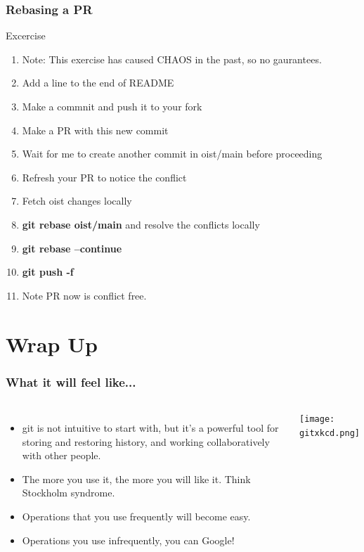 \documentclass{beamer}
\begin{document}
\begin{frame}[fragile]
	\frametitle{Rebasing a PR}
	\begin{block}{Excercise}
		\begin{enumerate}
			\item Note: This exercise has caused CHAOS in the past, so no gaurantees. 
			\item Add a line to the end of README
			\item Make a commnit and push it to your fork
			\item Make a PR with this new commit
			\item Wait for me to create another commit in oist/main before proceeding
			\item Refresh your PR to notice the conflict
			\item Fetch oist changes locally
			\item \textbf{git rebase oist/main} and resolve the conflicts locally
			\item \textbf{git rebase --continue}
			\item \textbf{git push -f}
			\item Note PR now is conflict free. 
		\end{enumerate}
	\end{block}
\end{frame}

\section{Wrap Up}

\begin{frame}
\frametitle{What it will feel like...}
\begin{columns}
\begin{itemize}
\item git is not intuitive to start with, but it's %
a powerful tool for storing and restoring history, and working collaboratively with other people.
\item The more you use it, the more you will like it. Think Stockholm syndrome.
\item Operations that you use frequently will become easy.
\item Operations you use infrequently, you can Google!
\end{itemize}
\texttt{[image: gitxkcd.png]}
\end{columns}
\end{frame}
\end{document}
